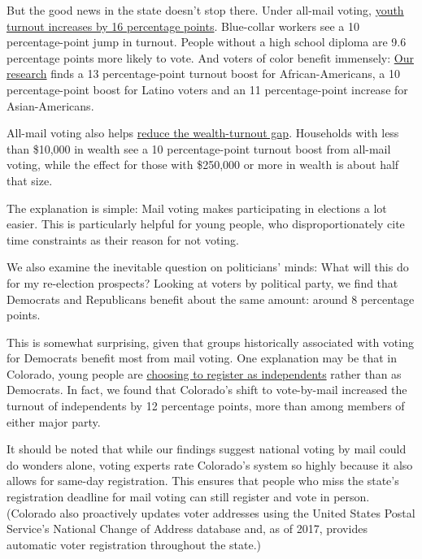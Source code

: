 But the good news in the state doesn't stop there. Under all-mail
voting,
\href{https://www.dropbox.com/s/8n4zjvgmytim1rv/Bonica_Grumbach_Hill_Jefferson_Mail_Voting.pdf?raw=1}{youth
turnout increases by 16 percentage points}. Blue-collar workers see a 10
percentage-point jump in turnout. People without a high school diploma
are 9.6 percentage points more likely to vote. And voters of color
benefit immensely:
\href{https://www.dropbox.com/s/8n4zjvgmytim1rv/Bonica_Grumbach_Hill_Jefferson_Mail_Voting.pdf?raw=1}{Our
research} finds a 13 percentage-point turnout boost for
African-Americans, a 10 percentage-point boost for Latino voters and an
11 percentage-point increase for Asian-Americans.

All-mail voting also helps
\href{https://www.dropbox.com/s/8n4zjvgmytim1rv/Bonica_Grumbach_Hill_Jefferson_Mail_Voting.pdf?raw=1}{reduce
the wealth-turnout gap}. Households with less than \$10,000 in wealth
see a 10 percentage-point turnout boost from all-mail voting, while the
effect for those with \$250,000 or more in wealth is about half that
size.

The explanation is simple: Mail voting makes participating in elections
a lot easier. This is particularly helpful for young people, who
disproportionately cite time constraints as their reason for not voting.

We also examine the inevitable question on politicians' minds: What will
this do for my re-election prospects? Looking at voters by political
party, we find that Democrats and Republicans benefit about the same
amount: around 8 percentage points.

This is somewhat surprising, given that groups historically associated
with voting for Democrats benefit most from mail voting. One explanation
may be that in Colorado, young people are
\href{https://www.npr.org/2016/02/24/467914349/explaining-indepedent-voters-in-colorado}{choosing
to register as independents} rather than as Democrats. In fact, we found
that Colorado's shift to vote-by-mail increased the turnout of
independents by 12 percentage points, more than among members of either
major party.

It should be noted that while our findings suggest national voting by
mail could do wonders alone, voting experts rate Colorado's system so
highly because it also allows for same-day registration. This ensures
that people who miss the state's registration deadline for mail voting
can still register and vote in person. (Colorado also proactively
updates voter addresses using the United States Postal Service's
National Change of Address database and, as of 2017, provides automatic
voter registration throughout the state.)

